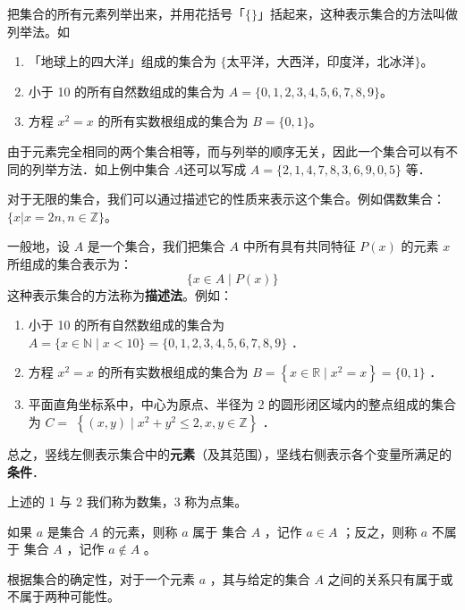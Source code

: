\begin{example}
    把集合的所有元素列举出来，并用花括号「$\{\}$」括起来，这种表示集合的方法叫做列举法。如
    \begin{enumerate}
        \item 「地球上的四大洋」组成的集合为 $\{\text{太平洋，大西洋，印度洋，北冰洋}\}$。
        \item 小于 10 的所有自然数组成的集合为 $A=\{0,1,2,3,4,5,6,7,8,9\}$。
        \item 方程 $x^2=x$ 的所有实数根组成的集合为 $B=\{0,1\}$。
    \end{enumerate}
\end{example}

\begin{tips}
    由于元素完全相同的两个集合相等，而与列举的顺序无关，因此一个集合可以有不同的列举方法．如上例中集合 $A$还可以写成 $A=\{2,1,4,7,8,3,6,9,0,5\}$ 等．
\end{tips}

\begin{definition}[描述法]
    对于无限的集合，我们可以通过描述它的性质来表示这个集合。例如偶数集合：$\{x|x=2n,n\in\mathbb{Z}\}$。
\end{definition}

\begin{example}
    一般地，设 $A$ 是一个集合，我们把集合 $A$ 中所有具有共同特征 $P(x)$ 的元素 $x$ 所组成的集合表示为：
    $$
        \{x \in A \mid P(x)\}
    $$
    这种表示集合的方法称为\textbf{描述法}。例如：
    \begin{enumerate}
        \item 小于 10 的所有自然数组成的集合为 $A=\{x \in \mathbb{N} \mid x<10\}=\{0,1,2,3,4,5,6,7,8,9\}$ ．
        \item 方程 $x^2=x$ 的所有实数根组成的集合为 $B=\left\{x \in \mathbb{R} \mid x^2=x\right\}=\{0,1\}$ ．
        \item 平面直角坐标系中，中心为原点、半径为 2 的圆形闭区域内的整点组成的集合为 $C=$ $\left\{(x, y) \mid x^2+y^2 \leq 2, x, y \in \mathbb{Z}\right\}$ ．
    \end{enumerate}
\end{example}

\begin{tips}
    总之，竖线左侧表示集合中的\textbf{元素}（及其范围），坚线右侧表示各个变量所满足的\textbf{条件}．

    上述的 1 与 2 我们称为数集，3 称为点集。
\end{tips}

\begin{warning}
    如果 $a$ 是集合 $A$ 的元素，则称 $a$ 属于 集合 $A$ ，记作 $a \in A$ ；反之，则称 $a$ 不属于 集合 $A$ ，记作 $a \notin A$ 。

    根据集合的确定性，对于一个元素 $a$ ，其与给定的集合 $A$ 之间的关系只有属于或不属于两种可能性。
\end{warning}

